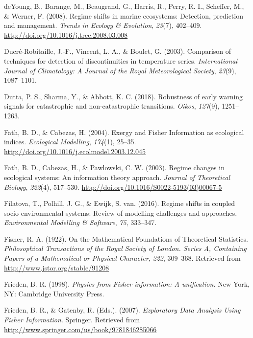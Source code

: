 \documentclass[12pt,twoside,openany]{reedthesis}
\begin{document}
\hypertarget{ref-deyoung_regime_2008}{}
deYoung, B., Barange, M., Beaugrand, G., Harris, R., Perry, R. I.,
Scheffer, M., \& Werner, F. (2008). Regime shifts in marine ecosystems:
Detection, prediction and management. \emph{Trends in Ecology \&
Evolution}, \emph{23}(7), 402--409.
\url{http://doi.org/10.1016/j.tree.2008.03.008}

\hypertarget{ref-ducre2003comparison}{}
Ducré-Robitaille, J.-F., Vincent, L. A., \& Boulet, G. (2003).
Comparison of techniques for detection of discontinuities in temperature
series. \emph{International Journal of Climatology: A Journal of the
Royal Meteorological Society}, \emph{23}(9), 1087--1101.

\hypertarget{ref-dutta2018robustness}{}
Dutta, P. S., Sharma, Y., \& Abbott, K. C. (2018). Robustness of early
warning signals for catastrophic and non-catastrophic transitions.
\emph{Oikos}, \emph{127}(9), 1251--1263.

\hypertarget{ref-fath_exergy_2004}{}
Fath, B. D., \& Cabezas, H. (2004). Exergy and Fisher Information as
ecological indices. \emph{Ecological Modelling}, \emph{174}(1), 25--35.
\url{http://doi.org/10.1016/j.ecolmodel.2003.12.045}

\hypertarget{ref-fath_regime_2003}{}
Fath, B. D., Cabezas, H., \& Pawlowski, C. W. (2003). Regime changes in
ecological systems: An information theory approach. \emph{Journal of
Theoretical Biology}, \emph{222}(4), 517--530.
\url{http://doi.org/10.1016/S0022-5193(03)00067-5}

\hypertarget{ref-filatova2016regime}{}
Filatova, T., Polhill, J. G., \& Ewijk, S. van. (2016). Regime shifts in
coupled socio-environmental systems: Review of modelling challenges and
approaches. \emph{Environmental Modelling \& Software}, \emph{75},
333--347.

\hypertarget{ref-fisher_mathematical_1922}{}
Fisher, R. A. (1922). On the Mathematical Foundations of Theoretical
Statistics. \emph{Philosophical Transactions of the Royal Society of
London. Series A, Containing Papers of a Mathematical or Physical
Character}, \emph{222}, 309--368. Retrieved from
\url{http://www.jstor.org/stable/91208}

\hypertarget{ref-frieden_physics_1998}{}
Frieden, B. R. (1998). \emph{Physics from Fisher information: A
unification.} New York, NY: Cambridge University Press.

\hypertarget{ref-frieden_exploratory_2007}{}
Frieden, B. R., \& Gatenby, R. (Eds.). (2007). \emph{Exploratory Data
Analysis Using Fisher Information}. Springer. Retrieved from
\url{http://www.springer.com/us/book/9781846285066}
\end{document}
